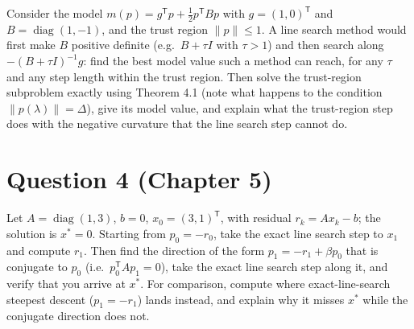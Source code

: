 \documentclass[11pt,a4paper]{article}
\newcommand{\T}{^{\mathsf T}}
\DeclareMathOperator{\diag}{diag}
\begin{document}
Consider the model $m(p)=g\T p+\tfrac12p\T Bp$ with $g=(1,0)\T$ and $B=\diag(1,-1)$, and the trust region $\|p\|\le1$.
A line search method would first make $B$ positive definite (e.g.\ $B+\tau I$ with $\tau>1$) and then search along $-(B+\tau I)^{-1}g$: find the best model value such a method can reach, for any $\tau$ and any step length within the trust region.
Then solve the trust-region subproblem exactly using Theorem 4.1 (note what happens to the condition $\|p(\lambda)\|=\Delta$), give its model value, and explain what the trust-region step does with the negative curvature that the line search step cannot do.


\section*{Question 4 (Chapter 5)}

Let $A=\diag(1,3)$, $b=0$, $x_{0}=(3,1)\T$, with residual $r_{k}=Ax_{k}-b$; the solution is $x^{*}=0$.
Starting from $p_{0}=-r_{0}$, take the exact line search step to $x_{1}$ and compute $r_{1}$.
Then find the direction of the form $p_{1}=-r_{1}+\beta p_{0}$ that is conjugate to $p_{0}$ (i.e.\ $p_{0}\T Ap_{1}=0$), take the exact line search step along it, and verify that you arrive at $x^{*}$.
For comparison, compute where exact-line-search steepest descent ($p_{1}=-r_{1}$) lands instead, and explain why it misses $x^{*}$ while the conjugate direction does not.
\end{document}
